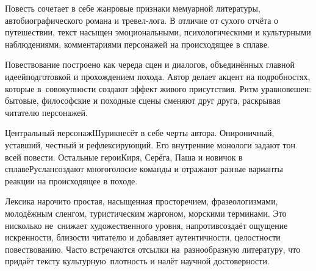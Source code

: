 {\small%
	


Повесть сочетает в себе жанровые признаки мемуарной литературы, автобиографического романа и тревел-лога. В отличие от сухого отчёта о путешествии, текст насыщен эмоциональными, психологическими и культурными наблюдениями, комментариями персонажей на происходящее в сплаве. %


Повествование построено как череда сцен и диалогов, объединённых главной идеей\mdash подготовкой и прохождением похода. Автор делает акцент на подробностях, которые в~совокупности создают эффект живого присутствия. Ритм уравновешен: бытовые, философские и походные сцены сменяют друг друга, раскрывая читателю персонажей.


Центральный персонаж\mdash Шурик\mdash несёт в себе черты автора. Он\mdash ироничный, уставший, честный и рефлексирующий. Его внутренние монологи задают тон всей повести. Остальные герои\mdash Киря, Серёга, Паша и новичок в сплаве\mdash Руслан\mdash создают многоголосие команды и отражают разные варианты реакции на происходящее в походе.


Лексика нарочито простая, насыщенная просторечием, фразеологизмами, молодёжным сленгом, туристическим жаргоном, морскими терминами. Это нисколько не~снижает художественного уровня, напротив\mdash создаёт ощущение искренности, близости читателю и добавляет аутентичности, целостности повествованию. Часто встречаются отсылки на~разнообразную литературу, что придаёт тексту культурную~плотность и налёт научной достоверности.
	
}

\clearpage

\thispagestyle{plain}   %
%
%

